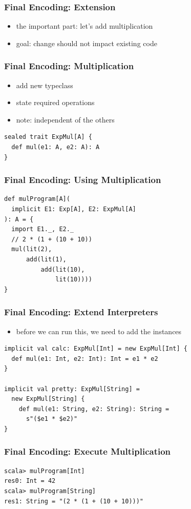 \documentclass{beamer}
\begin{document}
\begin{frame}
  \frametitle{Final Encoding: Extension}
  \begin{itemize}
  \item the important part: let's add multiplication
  \item goal: change should not impact existing code
  \end{itemize}
\end{frame}

\begin{frame}[fragile]
  \frametitle{Final Encoding: Multiplication}
  \begin{itemize}
  \item add new typeclass
  \item state required operations
  \item note: independent of the others
  \end{itemize}

\begin{verbatim}
sealed trait ExpMul[A] {
  def mul(e1: A, e2: A): A
}
\end{verbatim}
\end{frame}

\begin{frame}[fragile]
  \frametitle{Final Encoding: Using Multiplication}
\begin{verbatim}
def mulProgram[A](
  implicit E1: Exp[A], E2: ExpMul[A]
): A = {
  import E1._, E2._
  // 2 * (1 + (10 + 10))
  mul(lit(2),
      add(lit(1),
          add(lit(10),
              lit(10))))
}
\end{verbatim}
\end{frame}

\begin{frame}[fragile]
  \frametitle{Final Encoding: Extend Interpreters}
  \begin{itemize}
  \item before we can run this, we need to add the instances
  \end{itemize}
\begin{verbatim}
implicit val calc: ExpMul[Int] = new ExpMul[Int] {
  def mul(e1: Int, e2: Int): Int = e1 * e2
}

implicit val pretty: ExpMul[String] =
  new ExpMul[String] {
    def mul(e1: String, e2: String): String =
      s"($e1 * $e2)"
}

\end{verbatim}
\end{frame}

\begin{frame}[fragile]
  \frametitle{Final Encoding: Execute Multiplication}
\begin{verbatim}
scala> mulProgram[Int]
res0: Int = 42
scala> mulProgram[String]
res1: String = "(2 * (1 + (10 + 10)))"
\end{verbatim}
\end{frame}
\end{document}
